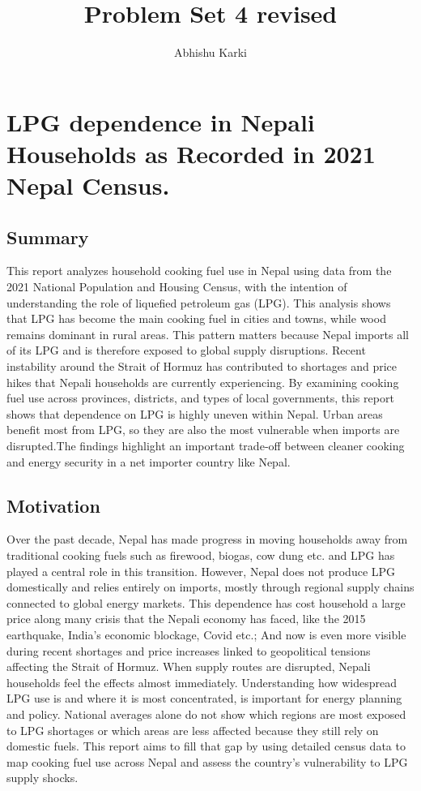 \documentclass[
  letterpaper,
  DIV=11,
  numbers=noendperiod]{scrartcl}
\title{Problem Set 4 revised}
\author{Abhishu Karki}
\date{}
\begin{document}
\maketitle


\section{LPG dependence in Nepali Households as Recorded in 2021 Nepal
Census.}\label{lpg-dependence-in-nepali-households-as-recorded-in-2021-nepal-census.}

\subsection{Summary}\label{summary}

This report analyzes household cooking fuel use in Nepal using data from
the 2021 National Population and Housing Census, with the intention of
understanding the role of liquefied petroleum gas (LPG). This analysis
shows that LPG has become the main cooking fuel in cities and towns,
while wood remains dominant in rural areas. This pattern matters because
Nepal imports all of its LPG and is therefore exposed to global supply
disruptions. Recent instability around the Strait of Hormuz has
contributed to shortages and price hikes that Nepali households are
currently experiencing. By examining cooking fuel use across provinces,
districts, and types of local governments, this report shows that
dependence on LPG is highly uneven within Nepal. Urban areas benefit
most from LPG, so they are also the most vulnerable when imports are
disrupted.The findings highlight an important trade‑off between cleaner
cooking and energy security in a net importer country like Nepal.

\subsection{Motivation}\label{motivation}

Over the past decade, Nepal has made progress in moving households away
from traditional cooking fuels such as firewood, biogas, cow dung etc.
and LPG has played a central role in this transition. However, Nepal
does not produce LPG domestically and relies entirely on imports, mostly
through regional supply chains connected to global energy markets. This
dependence has cost household a large price along many crisis that the
Nepali economy has faced, like the 2015 earthquake, India's economic
blockage, Covid etc.; And now is even more visible during recent
shortages and price increases linked to geopolitical tensions affecting
the Strait of Hormuz. When supply routes are disrupted, Nepali
households feel the effects almost immediately. Understanding how
widespread LPG use is and where it is most concentrated, is important
for energy planning and policy. National averages alone do not show
which regions are most exposed to LPG shortages or which areas are less
affected because they still rely on domestic fuels. This report aims to
fill that gap by using detailed census data to map cooking fuel use
across Nepal and assess the country's vulnerability to LPG supply
shocks.
\end{document}

